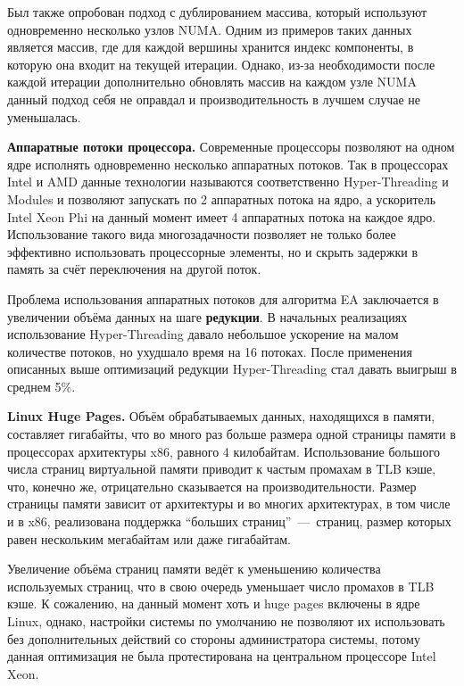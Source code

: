 \documentclass[a4paper,10pt]{extarticle}
\begin{document}
Был также опробован подход с дублированием массива, который используют одновременно несколько узлов NUMA. Одним из примеров таких данных является массив, где для каждой вершины хранится индекс компоненты, в которую она входит на текущей итерации. Однако, из-за необходимости после каждой итерации дополнительно обновлять массив на каждом узле NUMA данный подход себя не оправдал и производительность в лучшем случае не уменьшалась.



\textbf{Аппаратные потоки процессора.}
Современные процессоры позволяют на одном ядре исполнять одновременно несколько аппаратных потоков. Так в процессорах Intel и AMD данные технологии называются соответственно Hyper-Threading и Modules и позволяют запускать по 2 аппаратных потока на ядро, а ускоритель Intel Xeon Phi на данный момент имеет 4 аппаратных потока на каждое ядро. Использование такого вида многозадачности позволяет не только более эффективно использовать процессорные элементы, но и скрыть задержки в память за счёт переключения на другой поток.

Проблема использования аппаратных потоков для алгоритма EA заключается в увеличении объёма данных на шаге \textbf{редукции}. В начальных реализациях использование Hyper-Threading давало небольшое
ускорение на малом количестве потоков, но ухудшало время на 16 потоках. После применения описанных выше оптимизаций редукции Hyper-Threading стал давать выигрыш в среднем 5\%.



\textbf{Linux Huge Pages.}
Объём обрабатываемых данных, находящихся в памяти, составляет гигабайты, что во много раз больше размера одной страницы памяти в процессорах архитектуры x86, равного 4 килобайтам. Использование большого числа страниц виртуальной памяти приводит к частым промахам в TLB кэше, что, конечно же, отрицательно сказывается на производительности.
Размер страницы памяти зависит от архитектуры и во многих архитектурах, в том числе и в x86, реализована поддержка ``больших страниц''~---~страниц, размер которых равен нескольким мегабайтам или даже гигабайтам.

Увеличение объёма страниц памяти ведёт к уменьшению количества используемых страниц, что в свою очередь уменьшает число промахов в TLB кэше.
К сожалению, на данный момент хоть и huge pages включены в ядре Linux, однако, настройки системы по умолчанию не позволяют их использовать без дополнительных действий со стороны администратора системы, потому данная оптимизация не была протестирована на центральном процессоре Intel Xeon.
\end{document}

